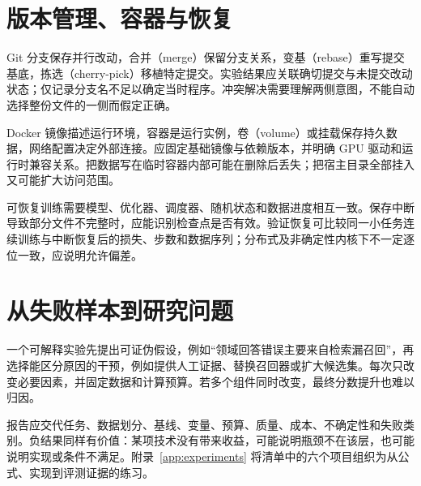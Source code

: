 \section{版本管理、容器与恢复}

Git 分支保存并行改动，合并（merge）保留分支关系，变基（rebase）重写提交基底，拣选（cherry-pick）移植特定提交。实验结果应关联确切提交与未提交改动状态；仅记录分支名不足以确定当时程序。冲突解决需要理解两侧意图，不能自动选择整份文件的一侧而假定正确。

Docker 镜像描述运行环境，容器是运行实例，卷（volume）或挂载保存持久数据，网络配置决定外部连接。应固定基础镜像与依赖版本，并明确 GPU 驱动和运行时兼容关系。把数据写在临时容器内部可能在删除后丢失；把宿主目录全部挂入又可能扩大访问范围。

可恢复训练需要模型、优化器、调度器、随机状态和数据进度相互一致。保存中断导致部分文件不完整时，应能识别检查点是否有效。验证恢复可比较同一小任务连续训练与中断恢复后的损失、步数和数据序列；分布式及非确定性内核下不一定逐位一致，应说明允许偏差。

\section{从失败样本到研究问题}

一个可解释实验先提出可证伪假设，例如“领域回答错误主要来自检索漏召回”，再选择能区分原因的干预，例如提供人工证据、替换召回器或扩大候选集。每次只改变必要因素，并固定数据和计算预算。若多个组件同时改变，最终分数提升也难以归因。

报告应交代任务、数据划分、基线、变量、预算、质量、成本、不确定性和失败类别。负结果同样有价值：某项技术没有带来收益，可能说明瓶颈不在该层，也可能说明实现或条件不满足。附录~\ref{app:experiments} 将清单中的六个项目组织为从公式、实现到评测证据的练习。

